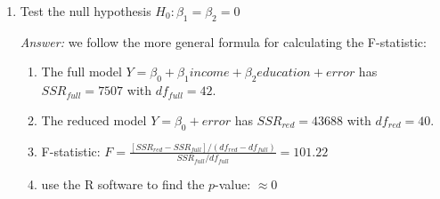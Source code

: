 \begin{enumerate}
  \item Test the null hypothesis $H_0: \beta_1 = \beta_2 = 0$\\
  \begin{pf}
  {\it Answer: } we follow the more general formula for calculating the F-statistic:
  \begin{enumerate}
    \item  The full model $Y = \beta_0 + \beta_1 income + \beta_2 education + error$ has $SSR_{full} = 7507$ with $df_{full} = 42$.
    \item The reduced model $Y = \beta_0 + error$ has $SSR_{red} = 43688$ with $df_{red} = 40$.
    \item F-statistic: $F = \frac{[SSR_{red} - SSR_{full}]/(df_{red} - df_{full})}{SSR_{full}/df_{full}} = 101.22$
    \item use the R software to find the $p$-value: $\approx 0$
  \end{enumerate}
  \end{pf}
\end{enumerate}








